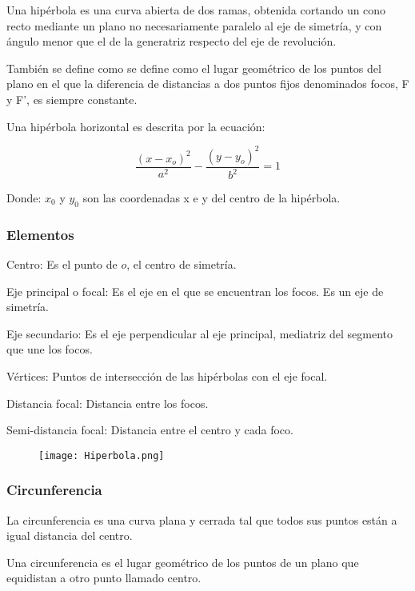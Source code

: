     Una hipérbola  es una curva abierta de dos ramas,
    obtenida cortando un cono recto mediante un plano no necesariamente
    paralelo al eje de simetría, y con ángulo menor que el de la generatriz
    respecto del eje de revolución.

    También se define como se define como el lugar geométrico de los puntos del
    plano en el que la diferencia de distancias a dos puntos fijos denominados
    focos, F y F', es siempre constante.

    Una hipérbola horizontal es descrita por la ecuación:

    $$ \frac{(x-x_o)^2}{a^2} - \frac{(y-y_o)^2}{b^2} = 1 $$

    Donde: $x_0$ y $y_0$ son las coordenadas x e y del centro de la hipérbola.

   \subsubsection*{Elementos} \label{Elementos}

    Centro: Es el punto de $o$, el centro de simetría.

    Eje principal o focal: Es el eje en el que se encuentran los focos. Es un
    eje de simetría.

    Eje secundario: Es el eje perpendicular al eje principal, mediatriz del
    segmento que une los focos.

    Vértices: Puntos de intersección de las hipérbolas con el eje focal.

    Distancia focal: Distancia entre los focos.

    Semi-distancia focal: Distancia entre el centro y cada foco.


    \begin{figure}[htb]
 		\centering
		\texttt{[image: Hiperbola.png]}
        \vspace*{0.5cm}
	\end{figure}


    \subsubsection*{Circunferencia} \label{Circunferencia}

    La circunferencia es una curva plana y cerrada tal que todos sus puntos
    están a igual distancia del centro.

    Una circunferencia es el lugar geométrico de los puntos de un plano que
    equidistan a otro punto llamado centro.

